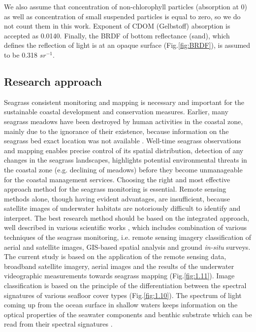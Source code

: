 \documentclass[11pt]{article}
\begin{document}
We also assume that concentration of non-chlorophyll particles (absorption at 0) as well as concentration of small suspended particles is equal to zero, so we do not count them in this work. Exponent of \ac{CDOM} (Gelbstoff) absorption is accepted as 0.0140. Finally, the \ac{BRDF} of bottom reflectance (sand), which defines the reflection of light  is at an opaque surface (Fig.\ref{fig:BRDF})\label{page-11}, is assumed to be 0.318 $sr^{-1}$.

\subsection{Research approach}
Seagrass consistent monitoring and mapping is necessary and important for the sustainable coastal
development and conservation measures. Earlier, many seagrass meadows have been destroyed by
human activities in the coastal zone, mainly due to the ignorance of their existence, because
information on the seagrass bed exact location was not available \cite{Choo06}\label{Choo06}. Well-time seagrass
observations and mapping enables precise control of its spatial distribution, detection of any changes
in the seagrass landscapes, highlights potential environmental threats in the coastal zone (e.g.
declining of meadows) before they become unmanageable for the coastal management services.
Choosing the right and most effective approach method for the seagrass monitoring is essential.
Remote sensing methods alone, though having evident advantages, are insufficient, because satellite
images of underwater habitats are notoriously difficult to identify and interpret. The best research
method should be based on the integrated approach, well described in various scientific works \cite{Brown02,Montefalcone06,Kirkman96}\label{Brown02} \label{Montefalcone06} \label{Kirkman96}, which includes combination of various
techniques of the seagrass monitoring, i.e. remote sensing imagery classification of aerial and satellite
images, GIS-based spatial analysis and ground \textit{in-situ} surveys.
The current study is based on the application of the remote sensing data, broadband satellite imagery,
aerial images and the results of the underwater videographic measurements towards seagrass
mapping  (Fig.\ref{fig:1.11})\label{page-9}. Image classification is based on the principle of the differentiation between the spectral
signatures of various seafloor cover types  (Fig.\ref{fig:1.10})\label{page-9}. The spectrum of light coming up from the ocean surface in
shallow waters keeps information on the optical properties of the seawater components and benthic
substrate which can be read from their spectral signatures \cite{Werdell03}\label{Werdell03}. 
\end{document}
